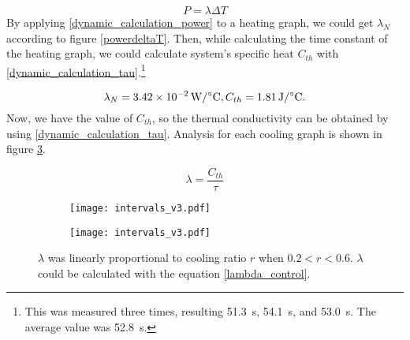 \begin{equation} \label{dynamic_calculation_power}
P = \lambda\Delta{T}
\end{equation}
By applying \eqref{dynamic_calculation_power} to a heating graph, we could get $\lambda_{N}$ according to figure \ref{powerdeltaT}. Then, while calculating the time constant of the heating graph, we could calculate \scp system's specific heat $C_{th}$ with \eqref{dynamic_calculation_tau}.\footnote{This was measured three times, resulting \SI{51.3}{\second}, \SI{54.1}{\second}, and \SI{53.0}{\second}. The average value was \SI{52.8}{\second}.} 

\begin{equation}
\lambda_{N}=\SI{3.42e-2}{\watt\per\degreeCelsius}, C_{th}=\SI{1.81}{\joule\per\degreeCelsius}. \notag
\end{equation}
Now, we have the value of $C_{th}$, so the thermal conductivity can be obtained by using \eqref{dynamic_calculation_tau}. Analysis for each cooling graph is shown in figure \ref{analysis_dynamic}.

\begin{equation} \label{dynamic_calculation_tau}
\lambda = \frac{C_{th}}{\tau}
\end{equation}

\begin{figure}[t]
	\begin{subfigure}[t]{0.52\linewidth}
		\centering\texttt{[image: intervals\_v3.pdf]}
		\caption{\label{dynamic_proportional}}
	\end{subfigure}%
	\begin{subfigure}[t]{0.39\linewidth}
		\centering\texttt{[image: intervals\_v3.pdf]}
		\caption{\label{linear_interval}}
	\end{subfigure}
	\caption[Analysis of the dynamic experiment]{ $\lambda$ was linearly proportional to cooling ratio $r$ when $0.2<r<0.6$.   $\lambda$ could be calculated with the equation \eqref{lambda_control}.}
	\label{analysis_dynamic}
\end{figure}

